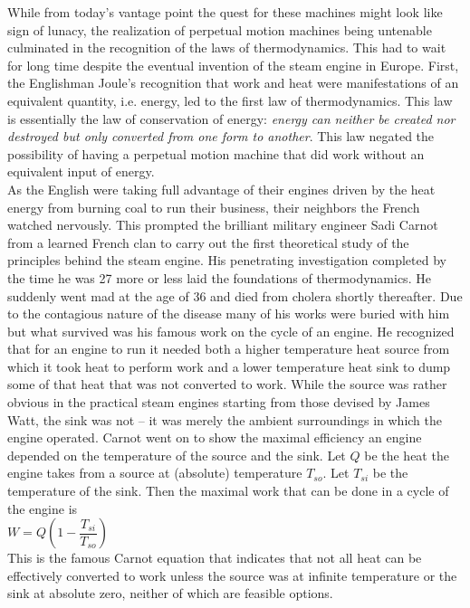 \documentclass[11pt]{article} %
\numberwithin{equation}{section}
\begin{document}
While from today’s vantage point the quest for these machines might look like sign of lunacy, the realization of perpetual motion machines being untenable culminated in the recognition of the laws of thermodynamics. This had to wait for long time despite the eventual invention of the steam engine in Europe. First, the Englishman Joule’s recognition that work and heat were manifestations of an equivalent quantity, i.e. energy, led to the first law of thermodynamics. This law is essentially the law of conservation of energy: \textit{energy can neither be created nor destroyed but only converted from one form to another}. This law negated the possibility of having a perpetual motion machine that did work without an equivalent input of energy.\\

As the English were taking full advantage of their engines driven by the heat energy from burning coal to run their business, their neighbors the French watched nervously. This prompted the brilliant military engineer Sadi Carnot from a learned French clan to carry out the first theoretical study of the principles behind the steam engine. His penetrating investigation completed by the time he was 27 more or less laid the foundations of thermodynamics. He suddenly went mad at the age of 36 and died from cholera shortly thereafter. Due to the contagious nature of the disease many of his works were buried with him but what survived was his famous work on the cycle of an engine. He recognized that for an engine to run it needed both a higher temperature heat source from which it took heat to perform work and a lower temperature heat sink to dump some of that heat that was not converted to work. While the source was rather obvious in the practical steam engines starting from those devised by James Watt, the sink was not -- it was merely the ambient surroundings in which the engine operated. Carnot went on to show the maximal efficiency an engine depended on the temperature of the source and the sink. Let $Q$ be the heat the engine takes from a source at (absolute) temperature $T_{so}$. Let $T_{si}$ be the temperature of the sink. Then the maximal work that can be done in a cycle of the engine is\\

 $W=Q\left(1-\dfrac{T_{si}}{T_{so}}\right)$\\
 
 This is the famous Carnot equation that indicates that not all heat can be effectively converted to work unless the source was at infinite temperature or the sink at absolute zero, neither of which are feasible options.\\
 
\end{document}
